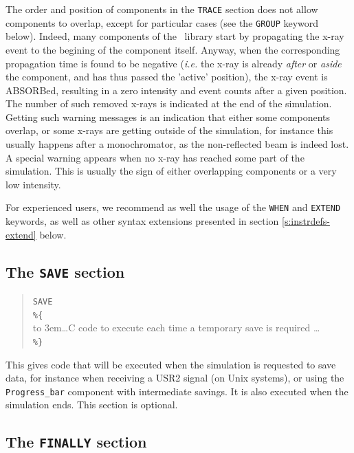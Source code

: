 The order and position of components in the \texttt{TRACE} section does not
allow components to overlap, except for particular cases (see the \texttt{GROUP} keyword below).
Indeed, many components of the \MCX\ library  start
by propagating the x-ray event to the begining of the component itself.
Anyway, when the corresponding propagation time is found to be negative
(\textit{i.e.} the x-ray is already \emph{after} or \emph{aside} the component, and has thus
passed the 'active' position), the x-ray event is ABSORBed, resulting in a zero intensity and event counts after a given position. The number of such removed x-rays is indicated at the end of the simulation.
Getting such warning messages is an indication that either some
components overlap, or some x-rays are getting outside of the
simulation, for instance this usually happens after a monochromator,
as the non-reflected beam is indeed lost. A special warning appears
when no x-ray has reached some part of the simulation. This is usually the sign of either overlapping components or a very low intensity. 

For experienced users, we recommend as well the usage of the \texttt{WHEN} and \texttt{EXTEND} keywords, as well as other syntax extensions presented in section \ref{s:instrdefs-extend} below.

\subsection{The \texttt{SAVE} section}
\label{s:save}

\begin{quote}
  \texttt{SAVE} \\
  \verb|%{| \\
  \hbox to 3em{}\ldots C code to execute each time a temporary save is required \ldots \\
  \verb|%}|
\end{quote} 
This gives code that will be executed when the simulation is requested to save data, for instance when receiving a USR2 signal (on Unix systems), or using the \verb+Progress_bar+ component with intermediate savings. It is also executed when the simulation ends. This section is optional.

\subsection{The \texttt{FINALLY} section}
\label{s:finally}

